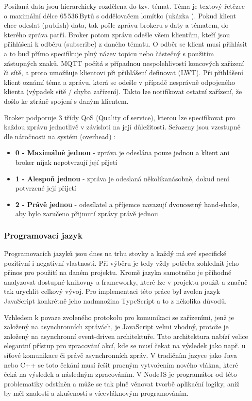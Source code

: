 Posílaná data jsou hierarchicky rozdělena do tzv. témat. Téma je textový řetězec o maximální délce 65\,536\,Bytů s oddělovačem lomítko (ukázka ). Pokud klient chce odeslat (publish) data, tak pošle zprávu brokeru s daty a tématem, do kterého zpráva patří. Broker potom zprávu odešle všem klientům, kteří jsou přihlášeni k odběru (subscribe) z daného tématu. O odběr se klient musí přihlásit a to buď přímo specifikuje plný název topicu nebo částečný s použitím zástupných znaků. MQTT počítá s případnou nespolehlivostí koncových zařízení či sítě, a proto umožňuje klientovi při přihlášení definovat  (\hypertarget{LWT}{LWT}). Při přihlášení klient oznámí téma a zprávu, která se odešle v případě nesprávně odpojeného klienta (výpadek sítě / chyba zařízení). Takto lze notifikovat ostatní zařízení, že došlo ke ztráně spojení s daným klientem. \cite{mqtt}

Broker podporuje 3 třídy QoS (Quality of service), kterou lze specifikovat pro každou zprávu jednotlivě v závisloti na její důležitosti. Seřazeny jsou vzestupně dle náročnosti na systém (overhead) \cite{mqtt}:
\begin{itemize}
    \item \textbf{0 - Maximálně jednou} - zpráva je odeslána pouze jednou a klient ani broker nijak nepotvrzují její přjetí
    \item \textbf{1 - Alespoň jednou} - zpráva je odeslaná několikanásobně, dokud není potvrzené její přijetí
    \item \textbf{2 - Právě jednou} - odesílatel a příjemce navazují dvoucestný hand-shake, aby bylo zaručeno přijmutí zprávy právě jednou
\end{itemize}


\subsubsection{Programovací jazyk}
Programovacích jazyků jsou dnes na trhu stovky a každý má své specifické pozitivní i negativní vlastnosti. Při výběru je tedy vždy potřeba zohlednit jeho přínos pro použití na daném projektu. Kromě jazyka samotného je příhodné analyzovat dostupné knihovny a frameworky, které lze v projektu použít a značně tak urychlit celkový vývoj. Pro implementaci této práce byl zvolen jazyk JavaScript konkrétně jeho nadmnožina TypeScript a to z několika důvodů.

Vzhledem k povaze zvoleného protokolu pro komunikaci se zařízeními, jenž je založený na asynchronních zprávách, je JavaScript velmi vhodný, protože je založený na asynchronní event-driven \cite{nodejs} architektuře. Tato architektura nabízí velice elegantní přístup pro zpracování akcí, kde se musí čekat na výsledek jako např. u síťové komunikace či právě asynchronních zpráv. V tradičním jazyce jako Java nebo C++ se toto čekání musí řešit pracným vytvořením nového vlákna, které čeká na výsledek a následným zpracováním. V NodeJS je programátor od této problematiky odstíněn a může se tak plně věnovat tvorbě aplikační logiky, aniž by měl znalosti a zkušenosti s vícevláknovým programováním.

